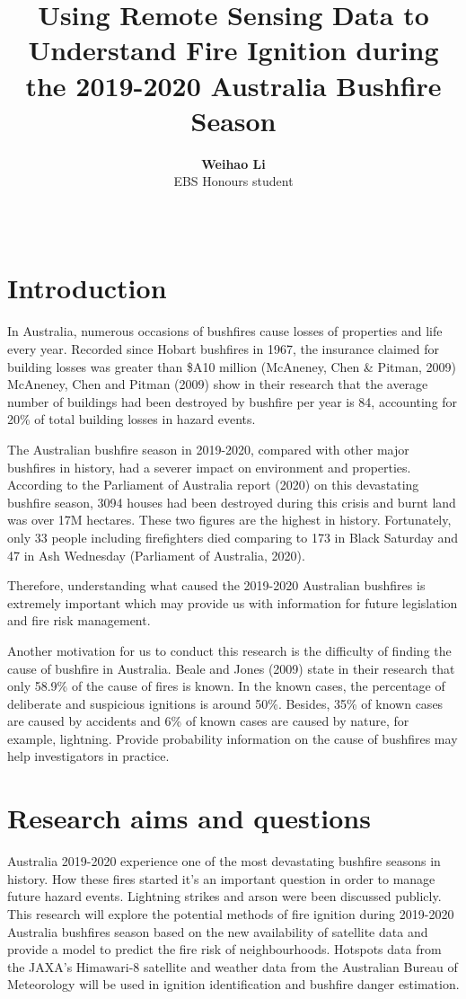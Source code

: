 \documentclass[11pt,a4paper,]{article}
\title{Using Remote Sensing Data to Understand Fire Ignition during the
2019-2020 Australia Bushfire Season}
\author{\sf\Large\textbf{ Weihao Li}\\ {\sf\large EBS Honours student\\[0.5cm]}}
\date{\sf\Date~\Month~\Year}
\makeatletter
\def\titlepage{\front{\expandafter{\@title}}{\@author}{\@organization}}
\makeatother
\begin{document}
\titlepage

\section{Introduction}\label{introduction}

In Australia, numerous occasions of bushfires cause losses of properties
and life every year. Recorded since Hobart bushfires in 1967, the
insurance claimed for building losses was greater than \$A10 million
(McAneney, Chen \& Pitman, 2009) McAneney, Chen and Pitman (2009) show
in their research that the average number of buildings had been
destroyed by bushfire per year is 84, accounting for 20\% of total
building losses in hazard events.

The Australian bushfire season in 2019-2020, compared with other major
bushfires in history, had a severer impact on environment and
properties. According to the Parliament of Australia report (2020) on
this devastating bushfire season, 3094 houses had been destroyed during
this crisis and burnt land was over 17M hectares. These two figures are
the highest in history. Fortunately, only 33 people including
firefighters died comparing to 173 in Black Saturday and 47 in Ash
Wednesday (Parliament of Australia, 2020).

Therefore, understanding what caused the 2019-2020 Australian bushfires
is extremely important which may provide us with information for future
legislation and fire risk management.

Another motivation for us to conduct this research is the difficulty of
finding the cause of bushfire in Australia. Beale and Jones (2009) state
in their research that only 58.9\% of the cause of fires is known. In
the known cases, the percentage of deliberate and suspicious ignitions
is around 50\%. Besides, 35\% of known cases are caused by accidents and
6\% of known cases are caused by nature, for example, lightning. Provide
probability information on the cause of bushfires may help investigators
in practice.

\section{Research aims and questions}\label{research-aims-and-questions}

Australia 2019-2020 experience one of the most devastating bushfire
seasons in history. How these fires started it's an important question
in order to manage future hazard events. Lightning strikes and arson
were been discussed publicly. This research will explore the potential
methods of fire ignition during 2019-2020 Australia bushfires season
based on the new availability of satellite data and provide a model to
predict the fire risk of neighbourhoods. Hotspots data from the JAXA's
Himawari-8 satellite and weather data from the Australian Bureau of
Meteorology will be used in ignition identification and bushfire danger
estimation.
\end{document}
